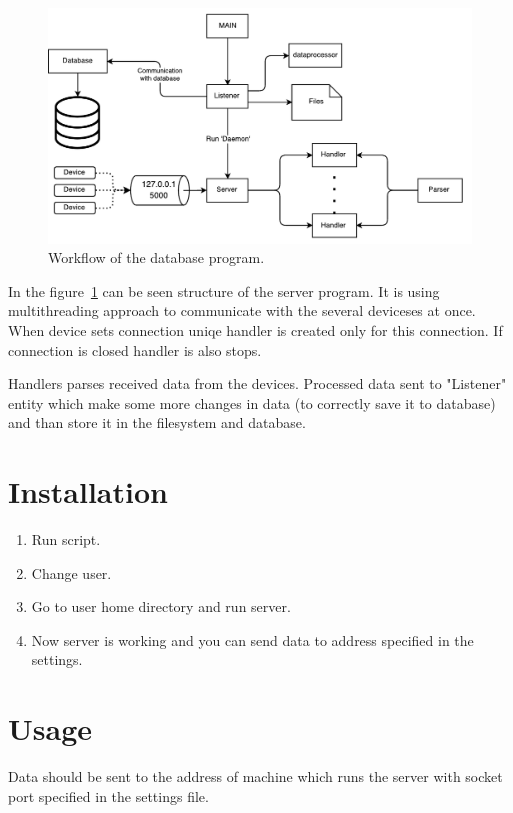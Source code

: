 \documentclass[12pt]{article}
\begin{document}
\begin{figure}[htb!]
    \includegraphics[width=1\textwidth]{./images/database_flow.pdf}
    \caption{Workflow of the database program.}
    \label{fig:database_flow}
    \centering
\end{figure}

\par In the figure~\ref{fig:database_flow} can be seen structure of the server
program. It is using multithreading approach to communicate with the several
deviceses at once. When device sets connection uniqe handler is created only
for this connection. If connection is closed handler is also stops.
\par Handlers parses received data from the devices. Processed data sent to
"Listener" entity which make some more changes in data (to correctly save it to
database) and than store it in the filesystem and database.

\section{Installation}
\par 
\begin{enumerate}
    \item Run script.
    \item Change user.
    \item Go to user home directory and run server.
    \item Now server is working and you can send data to address specified in
    the settings.
\end{enumerate}

\section{Usage}
\par Data should be sent to the address of machine which runs the server with
socket port specified in the settings file.
\end{document}
